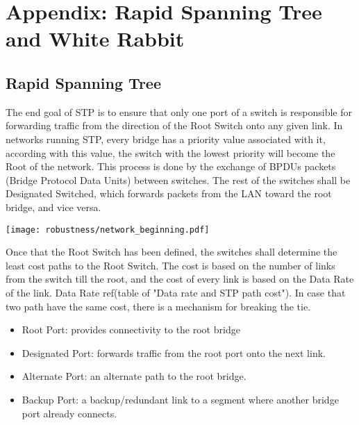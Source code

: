 \chapter{Appendix: Rapid Spanning Tree and White Rabbit}
\label{appD}

\section{Rapid Spanning Tree}

The end goal of STP is to ensure that only one port of a switch is responsible 
for forwarding traffic from the direction of the Root Switch onto any given
link. In networks running STP, every bridge has a priority value associated with
it, according with this value, the switch with the lowest priority will become
the Root of the network.  This process is done by the exchange of BPDUs packets
(Bridge Protocol Data Units) between switches. The rest of the switches shall be
Designated Switched, which forwards packets from the LAN toward the root bridge,
and vice versa.

\begin{center}
        \texttt{[image: robustness/network\_beginning.pdf]}
        \label{fig:redunt_net}
\end{center}


Once that the Root Switch has been defined, the switches shall determine
the least cost paths to the Root Switch. The cost is based on the number of
links from the switch till the root, and the cost of every link is based on the
Data Rate of the link. Data Rate ref(table of "Data rate and STP path cost"). In
case that two path have the same cost, there is a mechanism for breaking the
tie.

\begin{itemize}
        \item Root Port: provides connectivity to the root bridge
        \item Designated Port: forwards traffic from the root port onto the
next link.
        \item Alternate Port: an alternate path to the root bridge.
        \item Backup Port: a backup/redundant link to a segment where
another bridge port already connects.
\end{itemize}


